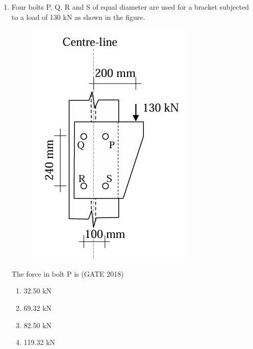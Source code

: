 \documentclass[journal,12pt,onecolumn]{IEEEtran}
\theoremstyle{remark}
\begin{document}
\begin{enumerate}
\newpage
\item Four bolts P, Q, R and S of equal diameter are used for a bracket subjected to a load of 130 kN as shown in the figure.
\begin{figure}[h]
    \centering
    \includegraphics[width=0.5\linewidth]{GATE-CE-2018/30-2.png}
    \caption{}
    \label{30-2}
\end{figure}
The force in bolt P is
\hfill{(GATE 2018)}
\begin{multicols}{4}
\begin{enumerate}
    \item 32.50 kN
    \item 69.32 kN
    \item 82.50 kN
    \item 119.32 kN
\end{enumerate}
\end{multicols}
\vspace{1cm}


\end{enumerate}
\end{document}

